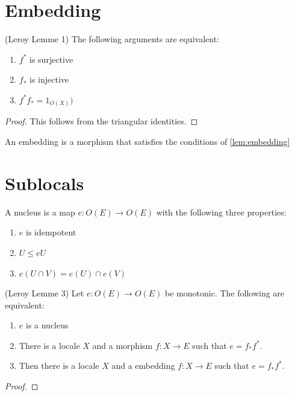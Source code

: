 \section{Embedding}
\begin{lemma}[Embedding]
(Leroy Lemme 1)
    \label{lem:embedding}
    \leanok
    The following arguments are equivalent:
    \begin{enumerate}
        \item $f^*$ is surjective
        \item $f_*$ is injective
        \item $f^{*}f_* = 1_{O(X)})$
    \end{enumerate}
\end{lemma}
\begin{proof}
    This follows from the triangular identities. \leanok
\end{proof}
\begin{definition}[Embedding]
    \label{def:embedding}
    An embedding is a morphism that satisfies the conditions of \ref{lem:embedding}
    \leanok
\end{definition}


\section{Sublocals}
\begin{definition}[Nucleus]
    \label{def:nucleus}
    \mathlibok
    A nucleus is a map $e : O(E) \rightarrow O(E)$ with the following three properties:
    \begin{enumerate}
        \item $e$ is idempotent
        \item $U \le e U$
        \item $e(U \cap V) = e(U) \cap e(V)$
    \end{enumerate}
\end{definition}

\begin{lemma}[Nucleus]
(Leroy Lemme 3)
    \label{lem:nucleus}
    \leanok
    Let $e : O(E) \rightarrow O(E)$ be monotonic. The following are equivalent:
    \begin{enumerate}
        \item $e$ is a nucleus
        \item There is a locale $X$ and a morphism $f: X \rightarrow E$ such that $e = f_*f^*$.
        \item Then there is a locale $X$ and a embedding $f: X \rightarrow E$ such that $e = f_*f^*$.
    \end{enumerate}
\end{lemma}
\begin{proof}
    \leanok
\end{proof}

